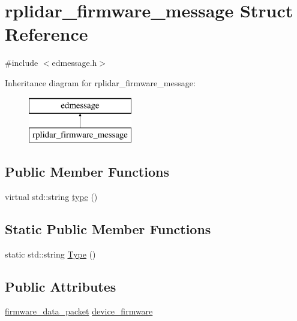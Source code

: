 \hypertarget{structrplidar__firmware__message}{\section{rplidar\-\_\-firmware\-\_\-message Struct Reference}
\label{structrplidar__firmware__message}
}


{\ttfamily \#include $<$edmessage.\-h$>$}

Inheritance diagram for rplidar\-\_\-firmware\-\_\-message\-:\begin{figure}[H]
\begin{center}
\leavevmode
\includegraphics[height=2.000000cm]{structrplidar__firmware__message}
\end{center}
\end{figure}
\subsection*{Public Member Functions}
\begin{DoxyCompactItemize}
\item 
virtual std\-::string \hyperlink{structrplidar__firmware__message_a6985ec56070c19af62cf4b95dbeb78f8}{type} ()
\end{DoxyCompactItemize}
\subsection*{Static Public Member Functions}
\begin{DoxyCompactItemize}
\item 
static std\-::string \hyperlink{structrplidar__firmware__message_a2ef1ac448780fdccaee555703b82d83e}{Type} ()
\end{DoxyCompactItemize}
\subsection*{Public Attributes}
\begin{DoxyCompactItemize}
\item 
\hyperlink{structfirmware__data__packet}{firmware\-\_\-data\-\_\-packet} \hyperlink{structrplidar__firmware__message_a0bed4488959ae399d04e8939dcc8bbcd}{device\-\_\-firmware}
\end{DoxyCompactItemize}



